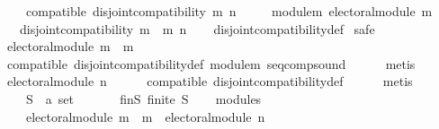 \begin{isabellebody}
\ \ \ \ compatible{\isacharcolon}{\kern0pt}\ {\isachardoublequoteopen}disjoint{\isacharunderscore}{\kern0pt}compatibility\ m\ n{\isachardoublequoteclose}\ \isanewline
\ \ \ \ module{\isacharunderscore}{\kern0pt}m{}{\isacharcolon}{\kern0pt}\ {\isachardoublequoteopen}electoral{\isacharunderscore}{\kern0pt}module\ m{}{\isachardoublequoteclose}\isanewline
\ \ \ {\isachardoublequoteopen}disjoint{\isacharunderscore}{\kern0pt}compatibility\ {\isacharparenleft}{\kern0pt}m\ {\isasymtriangleright}\ m{}{\isacharparenright}{\kern0pt}\ n{\isachardoublequoteclose}\isanewline
%
\isadelimproof
\ \ %
\endisadelimproof
%
\isatagproof
{}\isamarkupfalse%
\ disjoint{\isacharunderscore}{\kern0pt}compatibility{\isacharunderscore}{\kern0pt}def\isanewline
{}\isamarkupfalse%
\ {\isacharparenleft}{\kern0pt}safe{\isacharparenright}{\kern0pt}\isanewline
\ \ \isamarkupfalse%
\ {\isachardoublequoteopen}electoral{\isacharunderscore}{\kern0pt}module\ {\isacharparenleft}{\kern0pt}m\ {\isasymtriangleright}\ m{}{\isacharparenright}{\kern0pt}{\isachardoublequoteclose}\isanewline
\ \ \ \ \isamarkupfalse%
\ compatible\ disjoint{\isacharunderscore}{\kern0pt}compatibility{\isacharunderscore}{\kern0pt}def\ module{\isacharunderscore}{\kern0pt}m{}\ seq{\isacharunderscore}{\kern0pt}comp{\isacharunderscore}{\kern0pt}sound\isanewline
\ \ \ \ \isamarkupfalse%
\ metis\isanewline
{}\isamarkupfalse%
\isanewline
\ \ \isamarkupfalse%
\ {\isachardoublequoteopen}electoral{\isacharunderscore}{\kern0pt}module\ n{\isachardoublequoteclose}\isanewline
\ \ \ \ \isamarkupfalse%
\ compatible\ disjoint{\isacharunderscore}{\kern0pt}compatibility{\isacharunderscore}{\kern0pt}def\isanewline
\ \ \ \ \isamarkupfalse%
\ metis\isanewline
{}\isamarkupfalse%
\isanewline
\ \ \isamarkupfalse%
\isanewline
\ \ \ \ S\ {\isacharcolon}{\kern0pt}{\isacharcolon}{\kern0pt}\ {\isachardoublequoteopen}{\isacharprime}{\kern0pt}a\ set{\isachardoublequoteclose}\isanewline
\ \ \isamarkupfalse%
\isanewline
\ \ \ \ fin{\isacharunderscore}{\kern0pt}S{\isacharcolon}{\kern0pt}\ {\isachardoublequoteopen}finite\ S{\isachardoublequoteclose}\isanewline
\ \ \isamarkupfalse%
\ modules{\isacharcolon}{\kern0pt}\isanewline
\ \ \ \ {\isachardoublequoteopen}electoral{\isacharunderscore}{\kern0pt}module\ {\isacharparenleft}{\kern0pt}m\ {\isasymtriangleright}\ m{}{\isacharparenright}{\kern0pt}\ {\isasymand}\ electoral{\isacharunderscore}{\kern0pt}module\ n{\isachardoublequoteclose}\isanewline

\end{isabellebody}
